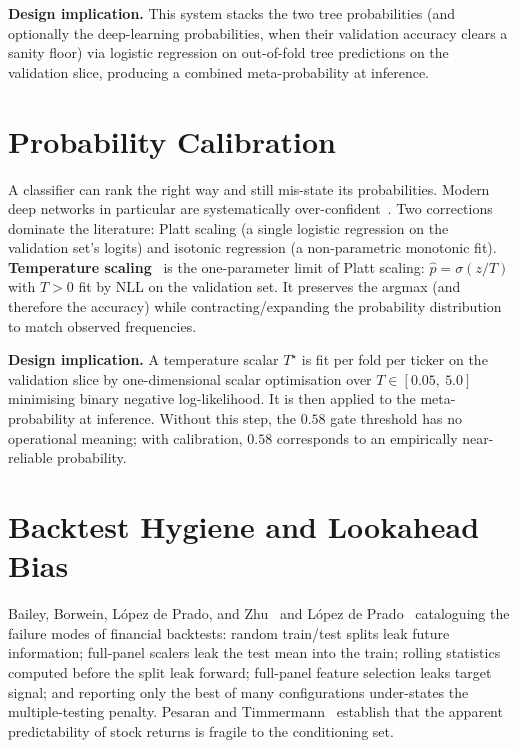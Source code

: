 \textbf{Design implication.} This system stacks the two tree probabilities (and optionally the deep-learning probabilities, when their validation accuracy clears a sanity floor) via logistic regression on out-of-fold tree predictions on the validation slice, producing a combined meta-probability at inference.

\section{Probability Calibration}

A classifier can rank the right way and still mis-state its probabilities. Modern deep networks in particular are systematically over-confident~\cite{guo2017calibration}. Two corrections dominate the literature: Platt scaling (a single logistic regression on the validation set's logits) and isotonic regression (a non-parametric monotonic fit). \textbf{Temperature scaling}~\cite{guo2017calibration} is the one-parameter limit of Platt scaling: $\hat p = \sigma(z / T)$ with $T > 0$ fit by NLL on the validation set. It preserves the argmax (and therefore the accuracy) while contracting/expanding the probability distribution to match observed frequencies.

\textbf{Design implication.} A temperature scalar $T^\star$ is fit per fold per ticker on the validation slice by one-dimensional scalar optimisation over $T \in [0.05,\ 5.0]$ minimising binary negative log-likelihood. It is then applied to the meta-probability at inference. Without this step, the $0.58$ gate threshold has no operational meaning; with calibration, $0.58$ corresponds to an empirically near-reliable probability.

\section{Backtest Hygiene and Lookahead Bias}

Bailey, Borwein, L\'opez de Prado, and Zhu~\cite{bailey2014lookahead} and L\'opez de Prado~\cite{prado2018walkforward} cataloguing the failure modes of financial backtests: random train/test splits leak future information; full-panel scalers leak the test mean into the train; rolling statistics computed before the split leak forward; full-panel feature selection leaks target signal; and reporting only the best of many configurations under-states the multiple-testing penalty. Pesaran and Timmermann~\cite{pesaran1995predictability} establish that the apparent predictability of stock returns is fragile to the conditioning set.

